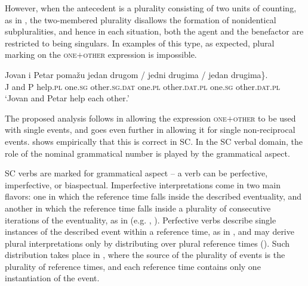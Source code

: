 \documentclass[output=paper,colorlinks,citecolor=brown]{langscibook}
\begin{document}
However, when the antecedent is a plurality consisting of two units of coun\-ting, as in , the two-membered plurality disallows the formation of nonidentical subpluralities, and hence in each situation, both the agent and the benefactor are restricted to being singulars. In examples of this type, as expected, plural marking on the \textsc{one$+$other} expression is impossible.

\ea\label{Jovan} \gll Jovan i Petar pomažu \minsp{\{} jedan drugom / \minsp{*} jedni drugima / {\minsp{*} jedan} drugima\}.\\
 J and P help.\textsc{pl} {} one.\textsc{sg} other.\textsc{sg.dat} {} {} one.\textsc{pl} other.\textsc{dat.\textsc{pl}} {} {{} one.\textsc{sg}} other.\textsc{dat.\textsc{pl}} \\
 \glt `Jovan and Petar help each other.'
 \z

\noindent The proposed analysis follows \citet{z14} in allowing the expression \textsc{one$+$other} to be used with single events, and goes even further in allowing it for single non-reciprocal events.  shows empirically that this is correct in SC. In the SC verbal domain, the role of the nominal grammatical number is played by the grammatical aspect.

SC verbs are marked for grammatical aspect -- a verb can be perfective, imperfective, or biaspectual. Imperfective interpretations come in two main flavors: one in which the reference time falls inside the described eventuality, and another in which the reference time falls inside a plurality of consecutive iterations of the eventuality, as in  (e.g. \citealt{a06}, \citealt{j07}). Perfective verbs describe single instances of the described event within a reference time, as in , and may derive plural interpretations only by distributing over plural reference times (\citealt{a06}). Such distribution takes place in , where the source of the plurality of events is the plurality of reference times, and each reference time contains only one instantiation of the event.

\ea\label{Jovan1} 
\label{Jovan1-a}
\end{document}
